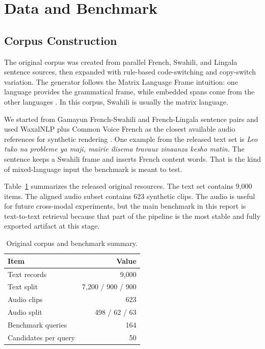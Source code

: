 \documentclass[11pt,twocolumn]{article}
\begin{document}
\section{Data and Benchmark}
\subsection{Corpus Construction}
The original corpus was created from parallel French, Swahili, and Lingala sentence sources, then expanded with rule-based code-switching and copy-switch variation. The generator follows the Matrix Language Frame intuition: one language provides the grammatical frame, while embedded spans come from the other languages \cite{myers-scotton1993}. In this corpus, Swahili is usually the matrix language.

We started from Gamayun French-Swahili and French-Lingala sentence pairs and used WaxalNLP plus Common Voice French as the closest available audio references for synthetic rendering \cite{gamayun-kit,gamayun-data,google-waxalnlp,common-voice-fr}. One example from the released text set is \emph{Leo tuko na probleme ya maji, mairie ilisema travaux zinaanza kesho matin.} The sentence keeps a Swahili frame and inserts French content words. That is the kind of mixed-language input the benchmark is meant to test.

Table~\ref{tab:data} summarizes the released original resources. The text set contains 9{,}000 items. The aligned audio subset contains 623 synthetic clips. The audio is useful for future cross-modal experiments, but the main benchmark in this report is text-to-text retrieval because that part of the pipeline is the most stable and fully exported artifact at this stage.

\begin{table}[t]
\centering
\caption{Original corpus and benchmark summary.}
\label{tab:data}
\begin{tabular}{@{}lr@{}}
\toprule
Item & Value \\
\midrule
Text records & 9{,}000 \\
Text split & 7{,}200 / 900 / 900 \\
Audio clips & 623 \\
Audio split & 498 / 62 / 63 \\
Benchmark queries & 164 \\
Candidates per query & 50 \\
\bottomrule
\end{tabular}
\end{table}
\end{document}
